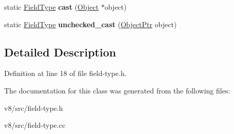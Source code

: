 \begin{DoxyCompactItemize}
\item 
\mbox{\label{classv8_1_1internal_1_1FieldType_ae09f3818bc73b2c1dfeab5d3b1262128}} 
static \mbox{\hyperlink{classv8_1_1internal_1_1FieldType}{Field\+Type}} {\bfseries cast} (\mbox{\hyperlink{classv8_1_1internal_1_1Object}{Object}} $\ast$object)
\item 
\mbox{\label{classv8_1_1internal_1_1FieldType_aeff187794e5dbe0bdd935a015c32f4a5}} 
static \mbox{\hyperlink{classv8_1_1internal_1_1FieldType}{Field\+Type}} {\bfseries unchecked\+\_\+cast} (\mbox{\hyperlink{classv8_1_1internal_1_1ObjectPtr}{Object\+Ptr}} object)
\end{DoxyCompactItemize}


\subsection{Detailed Description}


Definition at line 18 of file field-\/type.\+h.



The documentation for this class was generated from the following files\+:\begin{DoxyCompactItemize}
\item 
v8/src/field-\/type.\+h\item 
v8/src/field-\/type.\+cc\end{DoxyCompactItemize}
